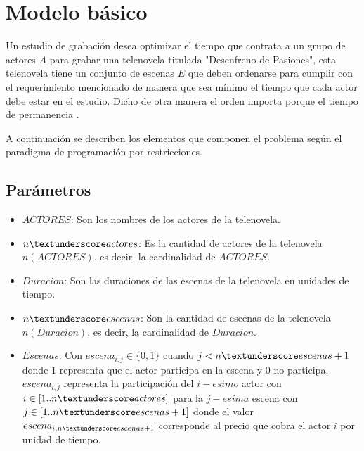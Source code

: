 \documentclass{article}
\begin{document}

\section{Modelo básico}
Un estudio de grabación desea optimizar el tiempo que contrata a un grupo de actores $A$ para grabar una telenovela titulada "Desenfreno de Pasiones", esta telenovela tiene un conjunto de escenas $E$ que deben ordenarse para cumplir con el requerimiento mencionado de manera que sea mínimo el tiempo que cada actor debe estar en el estudio. Dicho de otra manera el orden importa porque el tiempo de permanencia . \newline

A continuación se describen los elementos que componen el problema según el paradigma de programación por restricciones.

\subsection{Parámetros}
\begin{itemize}
    \item $ACTORES$: Son los nombres de los actores de la telenovela.
    \item $n\textunderscore actores$: Es la cantidad de actores de la telenovela $n(ACTORES)$, es decir, la cardinalidad de $ACTORES$.
    \item $Duracion$: Son las duraciones de las escenas de la telenovela en unidades de tiempo.
    \item $n\textunderscore escenas$: Son la cantidad de escenas de la telenovela $n(Duracion)$, es decir, la cardinalidad de $Duracion$.
    \item $Escenas$: Con $escena_{i,j} \in \{0,1\}$ cuando $j < n\textunderscore escenas + 1 $ donde  $1$ representa que el actor participa en la escena y $0$ no participa. $escena_{i,j}$ representa la participación del $i-esimo$ actor con $i \in [1..n\textunderscore actores]$ para la $j-esima$ escena con $j \in [1..n\textunderscore escenas + 1]$ donde el valor $escena_{i,n\textunderscore escenas + 1}$ corresponde al precio que cobra el actor $i$ por unidad de tiempo.
\end{itemize}
\end{document}
